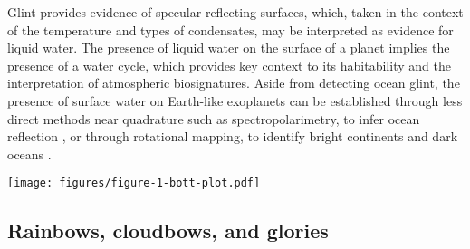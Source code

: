 \documentclass[usenatbib]{mnras}
\begin{document}
Glint provides evidence of specular reflecting surfaces, which, taken in the context of the temperature and types of condensates, may be interpreted as evidence for liquid water.
%
The presence of liquid water on the surface of a planet implies the presence of a water cycle, which provides key context to its habitability and the interpretation of atmospheric biosignatures.
%
Aside from detecting ocean glint, the presence of surface water on Earth-like exoplanets can be established through less direct methods near quadrature such as spectropolarimetry, to infer ocean reflection \citep{trees2022}, or through rotational mapping, to identify bright continents and dark oceans \citep[e.g.,][]{2009ApJ...700..915C,lustig2019}.


\begin{figure*}
    \centering
    \texttt{[image: figures/figure-1-bott-plot.pdf]}
    \caption{
        Phase curves of the normalised total and normalised linearly polarised flux of a cloudy planet with a wavy ocean surface and an Earth-like atmosphere in an edge-on orbit (adapted from \citealt{treesandstam2019}).  
        The wind speed over the ocean---which determines the wave height \citep{CoxMunk1954}---is \qty{7}{\meter\per\second}, and the clouds consist of spherical water droplets.
        The cloud coverage fraction is 0.5, and while the cloud pattern is patchy, the glint is always cloud-free. 
        The fluxes are normalised such that the total (i.e., unpolarised + polarised) flux equals the planet's geometric albedo at phase angle $\alpha = \qty{0}{\degree}$.
        In the bottom panel, we illustrate the scattering angle ranges of glories, rainbows, Rayleigh scattering, and ocean glint. 
        Note that the features in the actual curves partly overlap.
        The glory illustration is taken from \citet{Zakovryashin_2020}; all other illustrations are from \href{https://unsplash.com}{unsplash.com} [\href{https://unsplash.com/photos/YWL4dqqiRdk}{1}, \href{https://unsplash.com/photos/BgFOMcg4HNs}{2}, \href{https://unsplash.com/photos/9YdePM6BrO4}{3}].
        This figure is best viewed in colour.
    }
    \label{fig:bottplot}
\end{figure*}

\subsection{Rainbows, cloudbows, and glories}
\end{document}
